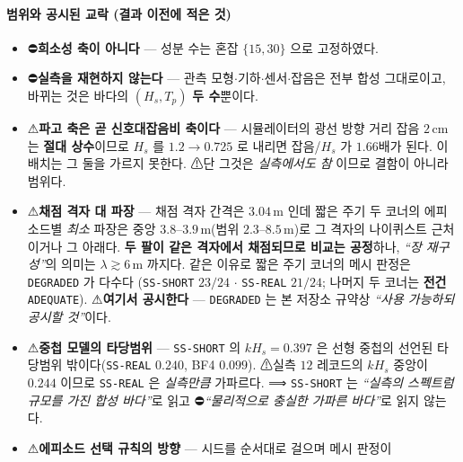 \documentclass[11pt]{report}
\numberwithin{equation}{chapter}
\numberwithin{figure}{chapter}
\numberwithin{table}{chapter}
\begin{document}
\paragraph{범위와 공시된 교락 (결과 이전에 적은 것)}
\begin{itemize}
  \item ⛔\textbf{희소성 축이 아니다} --- 성분 수는 혼잡 $\{15, 30\}$ 으로 고정하였다.
  \item ⛔\textbf{실측을 재현하지 않는다} --- 관측 모형$\cdot$기하$\cdot$센서$\cdot$잡음은
        전부 합성 그대로이고, 바뀌는 것은 바다의 $(H_s, T_p)$ \textbf{두 수}뿐이다.
  \item ⚠\textbf{파고 축은 곧 신호대잡음비 축이다} --- 시뮬레이터의 광선 방향 거리 잡음
        $2$\,cm 는 \textbf{절대 상수}이므로 $H_s$ 를 $1.2 \to 0.725$ 로 내리면 잡음/$H_s$ 가
        $1.66$배가 된다. 이 배치는 그 둘을 가르지 못한다. ⚠단 그것은 \emph{실측에서도 참}
        이므로 결함이 아니라 범위다.
  \item ⚠\textbf{채점 격자 대 파장} --- 채점 격자 간격은 $3.04$\,m 인데 짧은 주기 두 코너의
        에피소드별 \emph{최소} 파장은 중앙 $3.8$--$3.9$\,m(범위 $2.3$--$8.5$\,m)로
        그 격자의 나이퀴스트 근처이거나 그 아래다. \textbf{두 팔이 같은 격자에서
        채점되므로 비교는 공정}하나, \emph{``장 재구성''}의 의미는 $\lambda \gtrsim 6$\,m 까지다.
        같은 이유로 짧은 주기 코너의 메시 판정은 \texttt{DEGRADED} 가 다수다
        (\texttt{SS-SHORT} $23/24$ $\cdot$ \texttt{SS-REAL} $21/24$; 나머지 두 코너는
        \textbf{전건} \texttt{ADEQUATE}). ⚠\textbf{여기서 공시한다} --- \texttt{DEGRADED} 는
        본 저장소 규약상 \emph{``사용 가능하되 공시할 것''}이다.
  \item ⚠\textbf{중첩 모델의 타당범위} --- \texttt{SS-SHORT} 의 $k H_s = 0.397$ 은
        선형 중첩의 선언된 타당범위 밖이다(\texttt{SS-REAL} $0.240$, BF4 $0.099$).
        ⚠실측 $12$ 레코드의 $k H_s$ 중앙이 $0.244$ 이므로 \texttt{SS-REAL} 은
        \emph{실측만큼} 가파르다. ⟹ \texttt{SS-SHORT} 는
        \emph{``실측의 스펙트럼 규모를 가진 합성 바다''}로 읽고
        ⛔\emph{``물리적으로 충실한 가파른 바다''}로 읽지 않는다.
  \item ⚠\textbf{에피소드 선택 규칙의 방향} --- 시드를 순서대로 걸으며 메시 판정이

\end{itemize}
\end{document}
